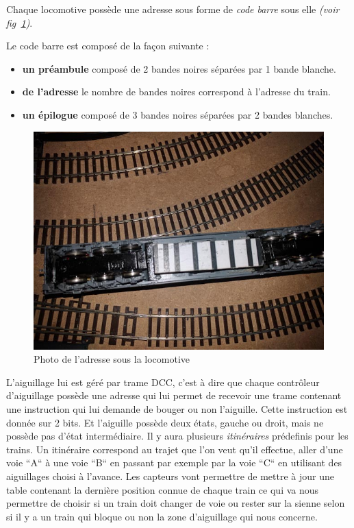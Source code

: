 \newpage

Chaque locomotive poss\`ede une adresse sous forme de \emph{code
barre} sous elle \emph{(voir fig~\ref{fig6})}.

Le code barre est compos\'e de la façon suivante :
\begin{itemize}
    \item \textbf{un pr\'eambule} compos\'e de 2 bandes noires
      s\'epar\'ees par 1 bande blanche.
    \item \textbf{de l'adresse} le nombre de bandes noires correspond
      à l'adresse du train. 
    \item \textbf{un \'epilogue} compos\'e de 3 bandes noires
      s\'epar\'ees par 2 bandes blanches.
\end{itemize}

\begin{figure}[h]
\centering
\includegraphics[scale=0.3]{add.jpg}
\caption{Photo de l'adresse sous la locomotive}
\label{fig6}
\end{figure}


L'aiguillage lui est géré par trame DCC, c'est à dire que chaque
contrôleur d'aiguillage possède une adresse qui lui permet de recevoir
une trame contenant une instruction qui lui demande de bouger ou non
l'aiguille.
Cette instruction est donnée sur 2 bits. Et l'aiguille possède deux
états, gauche ou droit, mais ne possède pas d'état intermédiaire.
\newline
\newline
Il y aura plusieurs \emph{itinéraires} prédefinis pour les trains. Un
itinéraire correspond au trajet que l'on veut qu'il effectue, aller
d'une voie ``A`` à une voie ``B`` en passant par exemple par la voie
``C`` en utilisant des aiguillages choisi à l'avance.
\newline
\newline
Les capteurs vont permettre de mettre à jour une table contenant la
dernière position connue de chaque train ce qui va nous permettre de
choisir si un train doit changer de voie ou rester sur la sienne selon
si il y a un train qui bloque ou non la zone d'aiguillage qui nous concerne.

